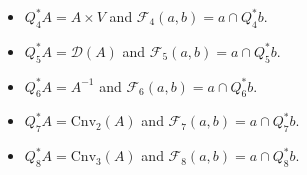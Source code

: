 \begin{itemize}
\item[(1)] $Q_4^*A = A \times V$ and $\mathcal{F}_4(a, b) = a \cap Q_4^*b$.
\item[(2)] $Q_5^*A = \mathcal{D}(A)$ and $\mathcal{F}_5(a, b) = a \cap Q_5^*b$.
\item[(3)] $Q_6^*A = A^{-1}$ and $\mathcal{F}_6(a, b) = a \cap Q_6^*b$.
\item[(4)] $Q_7^*A = \mathrm{Cnv}_2(A)$ and $\mathcal{F}_7(a, b) = a \cap Q_7^*b$.
\item[(5)] $Q_8^*A = \mathrm{Cnv}_3(A)$ and $\mathcal{F}_8(a, b) = a \cap Q_8^*b$.
\end{itemize}
